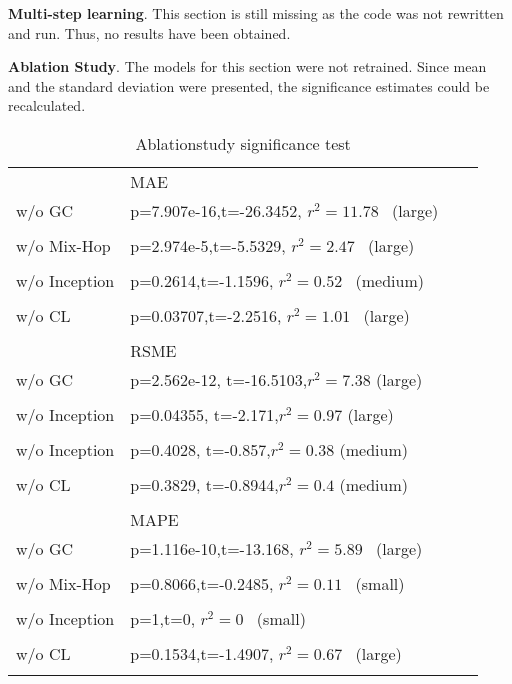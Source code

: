 \documentclass[letterpaper,twocolumn,11pt]{article}
\begin{document}
    \textbf{Multi-step learning}. This section is still missing as the code was not rewritten and run. Thus, no results have been obtained.

    \textbf{Ablation Study}. The models for this section were not retrained. Since mean and the standard deviation were presented, the significance estimates could be recalculated.
\begin{table}
       \scriptsize
\centering
\caption{Ablationstudy significance test}
\begin{tabular}{llll}
              & MAE                                                   \\
w/o GC        & p=7.907e-16,t=-26.3452, $r^2=11.78$~ (large)  \\
\hhline{--}\\
w/o Mix-Hop   & p=2.974e-5,t=-5.5329, $r^2=2.47$~ (large)     \\
\hhline{--}\\
w/o Inception & p=0.2614,t=-1.1596, $r^2=0.52$~ (medium)      \\
\hhline{--}\\
w/o CL        & p=0.03707,t=-2.2516, $r^2=1.01$~ (large)      \\
\hhline{==}\\
              & RSME                                                                                          \\
w/o GC & p=2.562e-12, t=-16.5103,$r^2=7.38$ (large)      \\
\hhline{--}\\
w/o Inception & p=0.04355, t=-2.171,$r^2=0.97$ (large)                                           \\
\hhline{--}\\
w/o Inception & p=0.4028, t=-0.857,$r^2=0.38$ (medium)                                           \\
\hhline{--} \\
w/o CL        & p=0.3829, t=-0.8944,$r^2=0.4$ (medium)                                             \\
\hhline{==}\\
              & MAPE                                              \\
w/o GC        & p=1.116e-10,t=-13.168, $r^2=5.89$~ (large)\\
\hhline{--}\\
w/o Mix-Hop   & p=0.8066,t=-0.2485, $r^2=0.11$~ (small)   \\
\hhline{--}\\
w/o Inception & p=1,t=0, $r^2=0$~ (small)               \\
\hhline{--}\\
w/o CL        & p=0.1534,t=-1.4907, $r^2=0.67$~ (large)   \\
\hhline{==}
\end{tabular}
\end{table}
\end{document}

